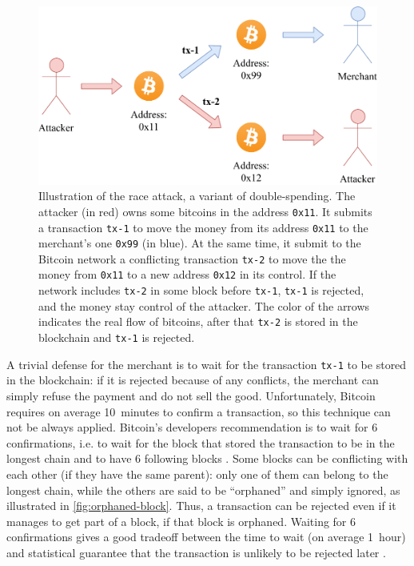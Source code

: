 \begin{figure}[t]
	\centering
	\vspace*{0.25cm}
	\includegraphics[scale=0.75]{figures/race_attack}
	\vspace*{0.25cm}
	\caption{
		Illustration of the race attack, a variant of double-spending.
		The attacker (in red) owns some bitcoins in the address \texttt{0x11}.
		It submits a transaction \texttt{tx-1} to move the money from its address \texttt{0x11} to the merchant's one \texttt{0x99} (in blue).
		At the same time, it submit to the Bitcoin network a conflicting transaction \texttt{tx-2} to move the the money from \texttt{0x11} to a new address \texttt{0x12} in its control.
		If the network includes \texttt{tx-2} in some block before \texttt{tx-1}, \texttt{tx-1} is rejected, and the money stay control of the attacker.
		The color of the arrows indicates the real flow of bitcoins, after that \texttt{tx-2} is stored in the blockchain and \texttt{tx-1} is rejected.
	}
	\label{fig:race-attack}
\end{figure}

A trivial defense for the merchant is to wait for the transaction \texttt{tx-1} to be stored in the blockchain:
if it is rejected because of any conflicts, the merchant can simply refuse the payment and do not sell the good.
Unfortunately, Bitcoin requires on average \SI{10}{minutes} to confirm a transaction, so this technique can not be always applied.
Bitcoin's developers recommendation is to wait for \num{6} confirmations, i.e. to wait for the block that stored the transaction to be in the longest chain and to have \num{6} following blocks \cite{confirmation}.
Some blocks can be conflicting with each other (if they have the same parent):
only one of them can belong to the longest chain, while the others are said to be ``orphaned'' \cite{orphaned_block} and simply ignored, as illustrated in \cref{fig:orphaned-block}.
Thus, a transaction can be rejected even if it manages to get part of a block, if that block is orphaned.
Waiting for \num{6} confirmations gives a good tradeoff between the time to wait (on average \SI{1}{hour}) and statistical guarantee that the transaction is unlikely to be rejected later \cite{bitcoin_2009}.

